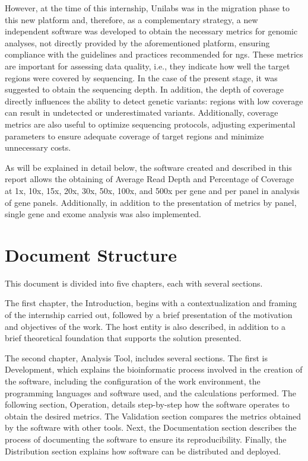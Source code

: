However, at the time of this internship, Unilabs was in the migration phase to this new platform and, therefore, as a complementary strategy, a new independent software was developed to obtain the necessary metrics for genomic analyses, not directly provided by the aforementioned platform, ensuring compliance with the guidelines and practices recommended for \ac{ngs}. These metrics are important for assessing data quality, i.e., they indicate how well the target regions were covered by sequencing. In the case of the present stage, it was suggested to obtain the sequencing depth. In addition, the depth of coverage directly influences the ability to detect genetic variants: regions with low coverage can result in undetected or underestimated variants. Additionally, coverage metrics are also useful to optimize sequencing protocols, adjusting experimental parameters to ensure adequate coverage of target regions and minimize unnecessary costs. 

As will be explained in detail below, the software created and described in this report allows the obtaining of Average Read Depth and Percentage of Coverage at 1x, 10x, 15x, 20x, 30x, 50x, 100x, and 500x per gene and per panel in analysis of gene panels. Additionally, in addition to the presentation of metrics by panel, single gene and exome analysis was also implemented.

\section{Document Structure}
This document is divided into five chapters, each with several sections. 

The first chapter, the Introduction, begins with a contextualization and framing of the internship carried out, followed by a brief presentation of the motivation and objectives of the work. The host entity is also described, in addition to a brief theoretical foundation that supports the solution presented. 

The second chapter, Analysis Tool, includes several sections. The first is Development, which explains the bioinformatic process involved in the creation of the software, including the configuration of the work environment, the programming languages and software used, and the calculations performed. The following section, Operation, details step-by-step how the software operates to obtain the desired metrics. The Validation section compares the metrics obtained by the software with other tools. Next, the Documentation section describes the process of documenting the software to ensure its reproducibility. Finally, the Distribution section explains how software can be distributed and deployed. 

